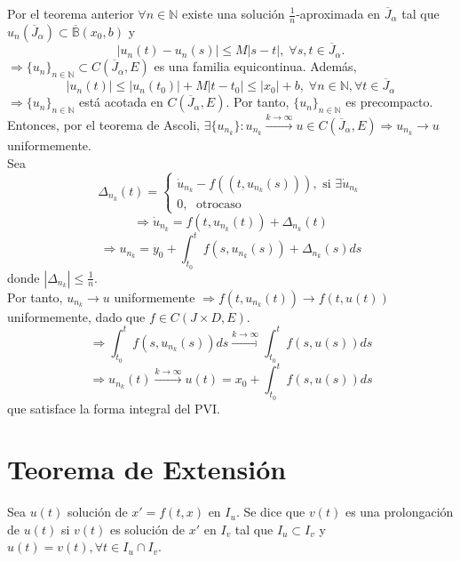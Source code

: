\begin{dem}
  Por el teorema anterior $\forall n \in \mathbb{N}$ existe una solución $\frac{1}{n}$-aproximada en $\overline{J}_{\alpha}$ tal que $u_{n}(\overline{J}_{\alpha}) \subset \overline{\mathbb{B}}(x_{0}, b)$ y
  \[ 
    | u_{n}(t) - u_{n}(s) | \leq M |  s - t | , \; \forall s,t \in \overline{J}_{\alpha}.
  \] 
  $ \Rightarrow \{ u_{n} \}_{n \in \mathbb{N}} \subset C(\overline{J}_{\alpha}, E)$ es una familia equicontinua. Además, 
  \[ 
    | u_{n}(t) | \leq | u_{n}(t_{0}) | + M | t - t_{0} | \leq | x_{0} | + b,\; \forall n \in \mathbb{N}, \forall t \in \overline{J}_{\alpha}
  \] 
  $ \Rightarrow \{ u_{n} \}_{n \in \mathbb{N}}$ está acotada en $C(\overline{J}_{\alpha}, E)$. Por tanto, $\{ u_{n} \}_{n \in \mathbb{N}}$ es precompacto. \\

  Entonces, por el teorema de Ascoli, $\exists \{ u_{n_{k}} \}: u_{n_{k}} \xrightarrow[]{ k \rightarrow \infty} u \in C(\overline{J}_{\alpha}, E) \Rightarrow u_{n_{k}} \rightarrow u$ uniformemente. \\

  Sea
  \[
    \Delta_{n_{k}}(t)  =
    \begin{cases}
      \dot{u}_{n_{k}} - f((t, u_{n_{k}}(s))), \text{ si } \exists \dot{u}_{n_{k}}\\
      0, \; \text{ otrocaso }
    \end{cases}
  \]
  \[ 
    \Rightarrow \dot{u}_{n_{k}} = f(t, u_{n_{k}}(t)) + \Delta_{n_{k}}(t)
  \] 
  \[ 
    \Rightarrow u_{n_{k}} = y_{0} + \int_{t_{0}}^{t} f(s, u_{n_{k}}(s)) + \Delta_{n_{k}}(s) ds
  \] 
  donde $| \Delta_{n_{k}} | \leq \frac{1}{n}$. \\

  Por tanto, $u_{n_{k}} \rightarrow u$ uniformemente $\Rightarrow f(t, u_{n_{k}}(t)) \rightarrow f(t, u(t))$ uniformemente, dado que $f \in C(J \times D, E)$.
  \[ 
    \Rightarrow \int_{t_{0}}^{t} f(s,u_{n_{k}}(s)) ds \xrightarrow[]{k \rightarrow \infty} \int_{t_{0}}^{t}  f(s, u(s)) ds
  \] 
  \[ 
    \Rightarrow  u_{n_{k}}(t) \xrightarrow[]{ k \rightarrow \infty } u(t) = x_{0} + \int_{t_{0}}^{t} f(s, u(s)) ds  
  \] 
  que satisface la forma integral del PVI.
\end{dem}

\section{Teorema de Extensión}

\begin{defn}[Prolongación]
  Sea $u(t)$ solución de $x' = f(t,x)$ en $I_{u}$. Se dice que $ v(t)$ es una prolongación de $u(t)$ si $v(t)$ es solución de $x'$ en $I_{v}$ tal que $I_{u} \subset I_{v}$ y $u(t) = v(t), \forall t \in I_{u} \cap I_{v}$.
\end{defn}

